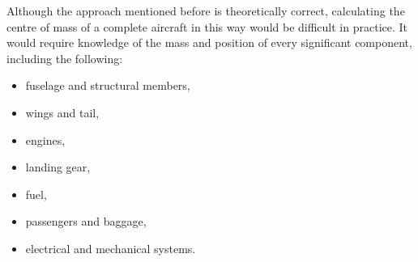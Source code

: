 \begin{solution}
	Although the approach mentioned before is theoretically correct, calculating the centre of mass of a complete aircraft in this way would be difficult in practice. It would require knowledge of the mass and position of every significant component, including the following:
	
	\begin{itemize} 
		\item fuselage and structural members, 
		\item wings and tail, \item engines, 
		\item landing gear, 
		\item fuel, 
		\item passengers and baggage, 
		\item electrical and mechanical systems. 
	\end{itemize}

\end{solution}
